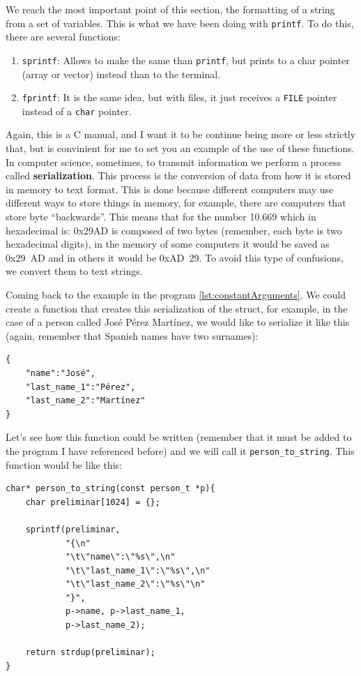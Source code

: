 \documentclass[a4paper]{article}
\begin{document}
We reach the most important point of this section, the formatting of a string
from a set of variables. This is what we have been doing with \verb!printf!.
To do this, there are several functions:
\begin{enumerate}
\item \verb!sprintf!: Allows to make the same than \verb!printf!, but prints to
a char pointer (array or vector) instead than to the terminal.
\item \verb!fprintf!: It is the same idea, but with files, it just receives a
\verb"FILE" pointer instead of a \verb"char" pointer.
\end{enumerate}

Again, this is a C manual, and I want it to be continue being more or less
strictly that, but is convinient for me to set you an example of the use of
these functions. In computer science, sometimes, to transmit information we
perform a process called \textbf{serialization}. This process is the conversion
of data from how it is stored in memory to text format. This is done because
different computers may use different ways to store things in memory, for
example, there are computers that store byte ``backwards''. This means that for
the number 10.669 which in hexadecimal is: 0x29AD is composed of two bytes
(remember, each byte is two hexadecimal digits), in the memory of some computers
it would be saved as 0x29~AD and in others it would be 0xAD~29. To avoid this
type of confusions, we convert them to text strings.

Coming back to the example in the program \ref{lst:constantArguments}. We could
create a function that creates this serialization of the struct, for example,
in the case of a person called José Pérez Martínez, we would like to serialize
it like this (again, remember that Spanish names have two surnames):
\begin{verbatim}
{
    "name":"José",
    "last_name_1":"Pérez",
    "last_name_2":"Martínez"
}
\end{verbatim}

Let's see how this function could be written (remember that it must be added to
the program I have referenced before) and we will call it
\verb!person_to_string!. This function would be like this:

\noindent
\begin{minipage}[H]{\linewidth}
\mbox{}
\begin{lstlisting}[style=C,
caption={Basic example of \texttt{sprintf}},
label={lst:sprintfExample}]
char* person_to_string(const person_t *p){
    char preliminar[1024] = {};

    sprintf(preliminar,
            "{\n"
            "\t\"name\":\"%s\",\n"
            "\t\"last_name_1\":\"%s\",\n"
            "\t\"last_name_2\":\"%s\"\n"
            "}",
            p->name, p->last_name_1,
            p->last_name_2);

    return strdup(preliminar);
}
\end{lstlisting}
\end{minipage}
\end{document}
